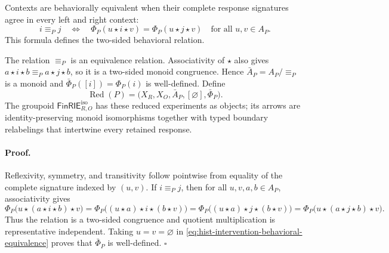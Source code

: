 Contexts are behaviorally equivalent when their complete response signatures
agree in every left and right context:
\begin{equation}
i\equiv_P j
\quad\Longleftrightarrow\quad
\Phi_P(u\star i\star v)=\Phi_P(u\star j\star v)
\quad\text{for all }u,v\in A_P.
\label{eq:hist-intervention-behavioral-equivalence}
\end{equation}
This formula defines the two-sided behavioral relation.  

The relation \(\equiv_P\) is an equivalence relation.  Associativity of
\(\star\) also gives
\(a\star i\star b\equiv_P a\star j\star b\), so it is a two-sided
monoid congruence.  Hence
\(\bar A_P=A_P/{\equiv_P}\) is a monoid and
\(\bar\Phi_P([i])=\Phi_P(i)\) is well-defined.  Define
\begin{equation}
\operatorname{Red}(P)
=\bigl(X_R,X_O,\bar A_P,[\varnothing],\bar\Phi_P\bigr).
\label{eq:hist-intervention-reduced-experiment}
\end{equation}
The groupoid \(\mathsf{FinRIE}_{R,O}^{\mathrm{iso}}\) has these reduced
experiments as objects; its arrows are identity-preserving monoid
isomorphisms together with typed boundary relabelings that intertwine every
retained response.  

\paragraph{Proof.}
Reflexivity, symmetry, and transitivity follow pointwise from equality of the
complete signature indexed by \((u,v)\).  If \(i\equiv_P j\), then for all
\(u,v,a,b\in A_P\), associativity gives
\[
\Phi_P\bigl(u\star(a\star i\star b)\star v\bigr)
=\Phi_P\bigl((u\star a)\star i\star(b\star v)\bigr)
=\Phi_P\bigl((u\star a)\star j\star(b\star v)\bigr)
=\Phi_P\bigl(u\star(a\star j\star b)\star v\bigr).
\]
Thus the relation is a two-sided congruence and quotient multiplication is
representative independent.  Taking \(u=v=\varnothing\) in
\eqref{eq:hist-intervention-behavioral-equivalence} proves that
\(\bar\Phi_P\) is well-defined.  \(\square\)

